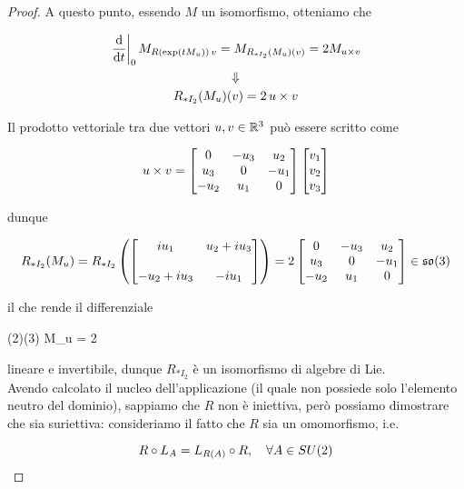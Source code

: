 \begin{proof}
	A questo punto, essendo $ M $ un isomorfismo, otteniamo che
	
	\begin{gather}
		\eval{ \dv{t} }_{0} M_{R(\exp(t M_{u})) \, v} = M_{R_{*I_{2}}(M_{u}) (v)} %
		= 2 M_{u \times v} \nonumber \\
		\Downarrow \\
		R_{*I_{2}}(M_{u}) (v) = 2 \, u \times v \nonumber
	\end{gather}
	
	Il prodotto vettoriale tra due vettori $ u,v \in \mathbb{R}^{3} $ può essere scritto come
	
	\begin{equation}
		u \times v = %
		\bmqty{ 0 & - u_{3} & u_{2} \\ u_{3} & 0 & - u_{1} \\ - u_{2} & u_{1} & 0 } %
		\bmqty{ v_{1} \\ v_{2} \\ v_{3} }
	\end{equation}
	
	dunque
	
	\begin{equation}
		R_{*I_{2}}(M_{u}) = %
		R_{*I_{2}} \left( \bmqty{ i u_{1} & u_{2} + i u_{3} \\\\ - u_{2} + i u_{3} & - i u_{1} } \right) = %
		2 \bmqty{ 0 & - u_{3} & u_{2} \\ u_{3} & 0 & - u_{1} \\ - u_{2} & u_{1} & 0 } \in \so(3)
	\end{equation}
	
	il che rende il differenziale
	
		{\su(2)}{\so(3)}
		{M_{u} = }
		{2 }
	
	lineare e invertibile, dunque $ R_{*I_{2}} $ è un isomorfismo di algebre di Lie.\\
	Avendo calcolato il nucleo dell'applicazione (il quale non possiede solo l'elemento neutro del dominio), sappiamo che $ R $ non è iniettiva, però possiamo dimostrare che sia suriettiva: consideriamo il fatto che $ R $ sia un omomorfismo, i.e.
	
	\begin{equation}
		R \circ L_{A} = L_{R(A)} \circ R \qcomma \forall A \in SU(2)
	\end{equation}


\end{proof}
